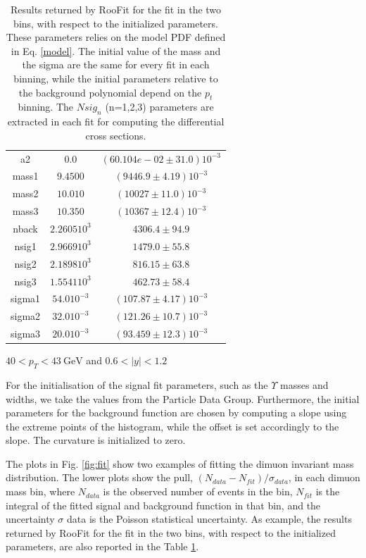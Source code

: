 \documentclass[a4paper,11pt]{article}
\begin{document}
\begin{table}[!h]
\begin{subtable}{.47\linewidth}
{\begin{tabular}{c|c|c}
                    a2  &   $0.0$   &  $(60.104e-02 \pm  31.0)$$10^{-3}$  \\
                 mass1  &  $9.4500$    &  $(9446.9 \pm  4.19)$$10^{-3}$  \\
                 mass2  &  $10.010$    &  $(10027 \pm  11.0)$$10^{-3}$  \\
                 mass3  &  $10.350$    &  $(10367 \pm  12.4)$$10^{-3}$ \\
                 nback  &  $2.2605$$10^3$  &  $4306.4 \pm  94.9$  \\
                 nsig1  &  $2.9669$$10^3$  &  $1479.0 \pm  55.8$  \\
                 nsig2  &  $2.1898$$10^3$  &  $816.15 \pm  63.8$  \\
                 nsig3  &  $1.5541$$10^3$  &  $462.73 \pm  58.4$  \\
                sigma1  &  $54.0$$10^{-3}$    &  $(107.87 \pm  4.17)$$10^{-3}$  \\
                sigma2  &  $32.0$$10^{-3}$    &  $(121.26 \pm  10.7)$$10^{-3}$  \\
                sigma3  &  $20.0$$10^{-3}$    &  $(93.459 \pm  12.3)$$10^{-3}$  \\
    \end{tabular}%
    }
    \egroup%
    \caption{$40<p_T<\SI{43}{\giga\eV}$ and $0.6<|y|<1.2$}
    \label{tab:fig2}
    \end{subtable}
    \caption{Results returned by RooFit for the fit in the two bins, with respect to the initialized parameters. These parameters relies on the model PDF defined in Eq. \eqref{model}. The initial value of the mass and the sigma are the same for every fit in each binning, while the initial parameters relative to the background polynomial depend on the $p_t$ binning. The $Nsig_n$ (n=1,2,3) parameters are extracted in each fit for computing the differential cross sections.}
\end{table}


For the initialisation of the signal fit parameters, such as the $\Upsilon$ masses and widths, we take the values from the Particle Data Group. Furthermore, the initial parameters for the background function are chosen by computing a slope using the extreme points of the histogram, while the offset is set accordingly to the slope. The curvature is initialized to zero.

The plots in Fig. \ref{fig:fit} show two examples of fitting the dimuon invariant mass distribution. The lower plots show the pull, $(N_{data} - N_{fit})/\sigma_{data}$, in each dimuon mass bin, where $N_{data}$ is the observed number of events in the bin, $N_{fit}$ is the integral of the fitted signal and background function in that bin, and the uncertainty $\sigma$ data is the Poisson statistical uncertainty. As example, the results returned by RooFit for the fit in the two bins, with respect to the initialized parameters, are also reported in the Table \ref{tab:fig2}. 
\end{document}
